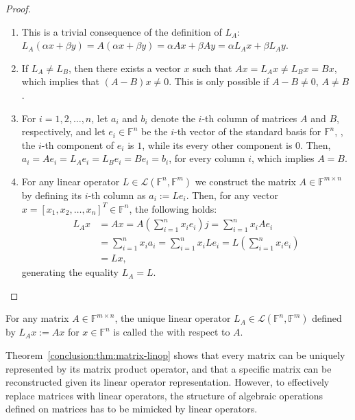 \begin{proof}~\\
\begin{enumerate}
\item This is a trivial consequence of the definition of $L_A$: $L_A(\alpha x +
\beta y) = A(\alpha x + \beta y) = \alpha Ax + \beta Ay = \alpha L_Ax + \beta
L_Ay$.
\item If $L_A \neq L_B$, then there exists a vector $x$ such that $Ax = L_Ax
\neq L_B x = Bx$, which implies that $(A - B)x \neq 0$. This is only possible if
$A - B \neq 0$, \ie $A \neq B$.
\item For $i = 1,2, \ldots, n$, let $a_i$ and $b_i$ denote the $i$-th column of
matrices $A$ and $B$, respectively, and let $e_i \in \mathbb{F}^n$ be the $i$-th
vector of the standard basis for $\mathbb{F}^n$, \ie, the $i$-th component of
$e_i$ is $1$, while its every other component is $0$. Then, $a_i = Ae_i = L_Ae_i
= L_B e_i = Be_i = b_i$, for every column $i$, which implies $A = B$.
\item For any linear operator $L \in \mathcal{L}(\mathbb{F}^n, \mathbb{F}^m)$ we
construct the matrix $A \in \mathbb{F}^{m \times n}$ by defining its $i$-th
column as $a_i := Le_i$. Then, for any vector $x = [ x_1, x_2, \ldots, x_n ]^T 
\in \mathbb{F}^n$, the following holds:
\begin{align}
L_Ax &= Ax = A(\sum_{i=1}^n x_i e_i) j = \sum_{i=1}^n x_i Ae_i \nonumber \\
     &= \sum_{i=1}^n x_i a_i = \sum_{i=1}^n x_i Le_i
      = L(\sum_{i=1}^n x_i e_i) \label{conclusion:eqn:surjection} \\
     &= Lx, \nonumber
\end{align}
generating the equality $L_A = L$.
\end{enumerate}
\end{proof}

\begin{definition}
For any matrix $A \in \mathbb{F}^{m \times n}$, the unique linear operator $L_A
\in \mathcal{L}(\mathbb{F}^n, \mathbb{F}^m)$ defined by $L_Ax := Ax$ for $x \in
\mathbb{F}^n$ is called the  with respect
to $A$.
\end{definition}

Theorem~\ref{conclusion:thm:matrix-linop} shows that every matrix can be
uniquely represented by its matrix product operator, and that a specific matrix
can be reconstructed given its linear operator representation. However, to
effectively replace matrices with linear operators, the structure of algebraic
operations defined on matrices has to be mimicked by linear operators.

